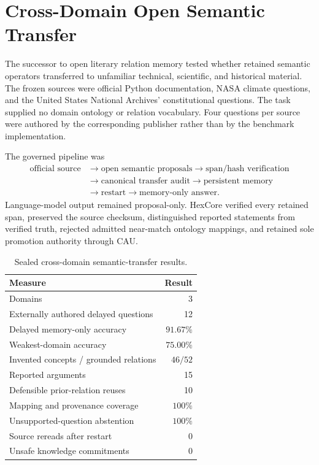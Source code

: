 \section{Cross-Domain Open Semantic Transfer}
\label{sec:cross-domain-semantic-transfer}

The successor to open literary relation memory tested whether retained semantic
operators transferred to unfamiliar technical, scientific, and historical
material.  The frozen sources were official Python documentation, NASA climate
questions, and the United States National Archives' constitutional questions.
The task supplied no domain ontology or relation vocabulary.  Four questions
per source were authored by the corresponding publisher rather than by the
benchmark implementation.

The governed pipeline was
\[
\begin{aligned}
\text{official source}
&\rightarrow \text{open semantic proposals}
\rightarrow \text{span/hash verification} \\
&\rightarrow \text{canonical transfer audit}
\rightarrow \text{persistent memory} \\
&\rightarrow \text{restart}
\rightarrow \text{memory-only answer}.
\end{aligned}
\]
Language-model output remained proposal-only.  HexCore verified every retained
span, preserved the source checksum, distinguished reported statements from
verified truth, rejected admitted near-match ontology mappings, and retained
sole promotion authority through CAU.

\begin{table}[htbp]
\centering
\caption{Sealed cross-domain semantic-transfer results.}
\begin{tabular}{lr}
\hline
Measure & Result \\
\hline
Domains & 3 \\
Externally authored delayed questions & 12 \\
Delayed memory-only accuracy & $91.67\%$ \\
Weakest-domain accuracy & $75.00\%$ \\
Invented concepts / grounded relations & $46 / 52$ \\
Reported arguments & 15 \\
Defensible prior-relation reuses & 10 \\
Mapping and provenance coverage & $100\%$ \\
Unsupported-question abstention & $100\%$ \\
Source rereads after restart & 0 \\
Unsafe knowledge commitments & 0 \\
\hline
\end{tabular}
\end{table}

